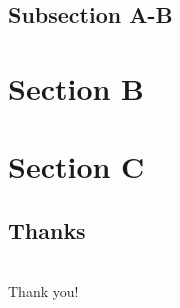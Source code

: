 \documentclass{beamer}
\begin{document}
\subsection{Subsection A-B}

\section{Section B}

\section{Section C}

\subsection*{Thanks}

\begin{frame}
\frametitle{\subsecname}
  \begin{columns}
  \column{2.5cm}
  \column{5cm}
    \Huge{Thank you!}
  \column{2.5cm}
  \end{columns}
\end{frame}
\end{document}
